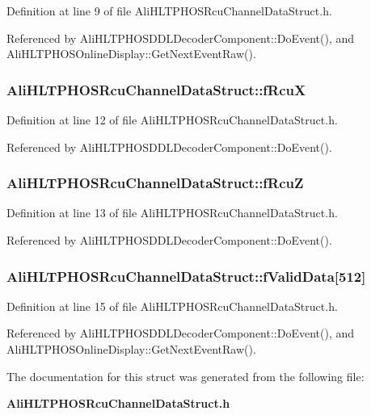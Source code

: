 Definition at line 9 of file Ali\-HLTPHOSRcu\-Channel\-Data\-Struct.h.

Referenced by Ali\-HLTPHOSDDLDecoder\-Component::Do\-Event(), and Ali\-HLTPHOSOnline\-Display::Get\-Next\-Event\-Raw().
\subsubsection{ {\bf Ali\-HLTPHOSRcu\-Channel\-Data\-Struct::f\-Rcu\-X}}\label{structAliHLTPHOSRcuChannelDataStruct_o2}




Definition at line 12 of file Ali\-HLTPHOSRcu\-Channel\-Data\-Struct.h.

Referenced by Ali\-HLTPHOSDDLDecoder\-Component::Do\-Event().
\subsubsection{ {\bf Ali\-HLTPHOSRcu\-Channel\-Data\-Struct::f\-Rcu\-Z}}\label{structAliHLTPHOSRcuChannelDataStruct_o3}




Definition at line 13 of file Ali\-HLTPHOSRcu\-Channel\-Data\-Struct.h.

Referenced by Ali\-HLTPHOSDDLDecoder\-Component::Do\-Event().
\subsubsection{ {\bf Ali\-HLTPHOSRcu\-Channel\-Data\-Struct::f\-Valid\-Data}[512]}\label{structAliHLTPHOSRcuChannelDataStruct_o4}




Definition at line 15 of file Ali\-HLTPHOSRcu\-Channel\-Data\-Struct.h.

Referenced by Ali\-HLTPHOSDDLDecoder\-Component::Do\-Event(), and Ali\-HLTPHOSOnline\-Display::Get\-Next\-Event\-Raw().

The documentation for this struct was generated from the following file:\begin{CompactItemize}
\item 
{\bf Ali\-HLTPHOSRcu\-Channel\-Data\-Struct.h}\end{CompactItemize}
